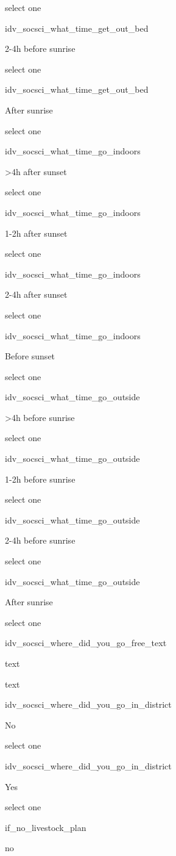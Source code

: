 \documentclass[]{article}
\begin{document}
select one

idv\_socsci\_what\_time\_get\_out\_bed

2-4h before sunrise

select one

idv\_socsci\_what\_time\_get\_out\_bed

After sunrise

select one

idv\_socsci\_what\_time\_go\_indoors

\textgreater{}4h after sunset

select one

idv\_socsci\_what\_time\_go\_indoors

1-2h after sunset

select one

idv\_socsci\_what\_time\_go\_indoors

2-4h after sunset

select one

idv\_socsci\_what\_time\_go\_indoors

Before sunset

select one

idv\_socsci\_what\_time\_go\_outside

\textgreater{}4h before sunrise

select one

idv\_socsci\_what\_time\_go\_outside

1-2h before sunrise

select one

idv\_socsci\_what\_time\_go\_outside

2-4h before sunrise

select one

idv\_socsci\_what\_time\_go\_outside

After sunrise

select one

idv\_socsci\_where\_did\_you\_go\_free\_text

text

text

idv\_socsci\_where\_did\_you\_go\_in\_district

No

select one

idv\_socsci\_where\_did\_you\_go\_in\_district

Yes

select one

if\_no\_livestock\_plan

no
\end{document}
